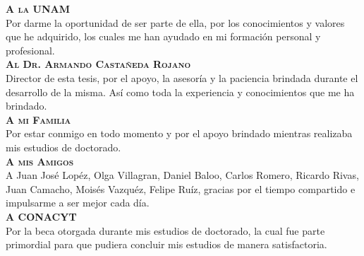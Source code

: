 \begin{agradecimientos}
  \textbf{\textsc{A la UNAM}}\\

  Por darme la oportunidad de ser parte de ella, por los conocimientos
  y valores que he adquirido, los cuales me han ayudado en mi
  formación personal y profesional.\\

  \textbf{\textsc{Al Dr. Armando Castañeda Rojano}}\\

  Director de esta tesis, por el apoyo, la asesoría y la paciencia
  brindada durante el desarrollo de la misma. Así como toda la
  experiencia y conocimientos que me ha brindado.\\

  \textbf{\textsc{A mi Familia}}\\

  Por estar conmigo en todo momento y por el apoyo brindado mientras
  realizaba mis estudios de doctorado.\\

  \textbf{\textsc{A mis Amigos}}\\

  A Juan José Lopéz, Olga Villagran, Daniel Baloo, Carlos Romero,
  Ricardo Rivas, Juan Camacho, Moisés Vazquéz, Felipe Ruíz, gracias
  por el tiempo compartido e impulsarme a ser mejor cada día.\\

  \textbf{\textsc{A CONACYT}}\\

  Por la beca otorgada durante mis estudios de doctorado, la cual fue
  parte primordial para que pudiera concluir mis estudios de manera
  satisfactoria.\\
\end{agradecimientos}